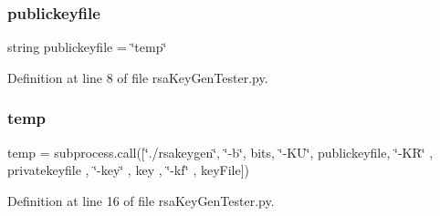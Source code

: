 \subsubsection{\texorpdfstring{publickeyfile}{publickeyfile}}
{\footnotesize\ttfamily string publickeyfile = \char`\"{}temp\char`\"{}}



Definition at line 8 of file rsa\+Key\+Gen\+Tester.\+py.

\mbox{\label{namespacersa_key_gen_tester_a905c521e05ec8042631a912b71d0454e}} 
\subsubsection{\texorpdfstring{temp}{temp}}
{\footnotesize\ttfamily temp = subprocess.\+call(\mbox{[}\char`\"{}./rsakeygen\char`\"{}, \char`\"{}-\/b\char`\"{}, bits, \char`\"{}-\/KU\char`\"{}, publickeyfile, \char`\"{}-\/KR\char`\"{} , privatekeyfile , \char`\"{}-\/key\char`\"{} , key , \char`\"{}-\/kf\char`\"{} , key\+File\mbox{]})}



Definition at line 16 of file rsa\+Key\+Gen\+Tester.\+py.

